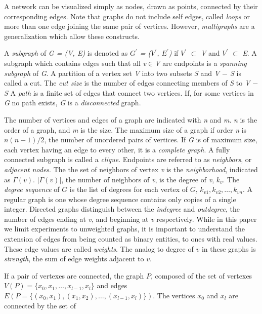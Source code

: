 A network can be visualized simply as nodes, drawn as points, connected by their corresponding edges. Note that graphs do not include self edges, called \textit{loops} or more than one edge joining the same pair of vertices. However, \textit{multigraphs} are a generalization which allow these constructs. 

A \textit{subgraph} of \textit{G = (V, E)} is denoted as \textit{$G^\prime$ = ($V^\prime$, $E^\prime$)} if \textit{$V^\prime$} $\subset$ \textit{V} and \textit{$V^\prime$} $\subset$ \textit{E}. A subgraph which contains edges such that all \textit{v}$\in$\textit{V} are endpoints is a \textit{spanning subgraph} of \textit{G}. 
A partition of a vertex set \textit{V} into two subsets \textit{S} and \textit{V $-$ S} is called a cut. The \textit{cut size} is the number of edges connecting members of \textit{S} to \textit{V $-$ S}
A \textit{path} is a finite set of edges that connect two vertices. If, for some vertices in \textit{G} no path exists, \textit{G} is a \textit{disconnected} graph.

The number of vertices and edges of a graph are indicated with \textit{n} and \textit{m}. \textit{n} is the order of a graph, and \textit{m} is the size. The maximum size of a graph if order \textit{n} is $n(n-1)/2$, the number of unordered pairs of vertices. If \textit{G} is of maximum size, each vertex having an edge to every other, it is a \textit{complete graph}. 
A fully connected subgraph is called a \textit{clique}. Endpoints are referred to as \textit{neighbors}, or \textit{adjacent nodes}. The the set of neighbors of vertex \textit{v} is the \textit{neighborhood}, indicated as \textit{$\Gamma(v)$}. $|\Gamma(v)|$, the number of neighbors of \textit{v}, is the degree of \textit{v}, $k_v$. The \textit{degree sequence} of $G$ is the list of degrees for each vertex of $G$, $k_{v1}, k_{v2},\dots, k_{vn}$. 
A regular graph is one whose degree sequence contains only copies of a single integer. Directed graphs distinguish between the \textit{indegree} and \textit{outdegree}, the number of edges ending at \textit{v}, and beginning at \textit{v} respectively. While in this paper we limit experiments to unweighted graphs, it is important to understand the extension of edges from being counted as binary entities, to ones with real values. These edge values are called \textit{weights}. The analog to degree of $v$ in these graphs is \textit{strength}, the sum of edge weights adjacent to $v$.


If a pair of vertexes are connected, the graph $P$, composed of the set of vertexes $V(P)=\{x_0, x_1,\dots, x_{l-1}, x_l\}$ and edges $E(P=\{(x_0,x_1), (x_1,x_2),\dots,(x_{l-1}, x_{l})\})$. The vertices $x_0$ and $x_l$ are connected by the set of 

